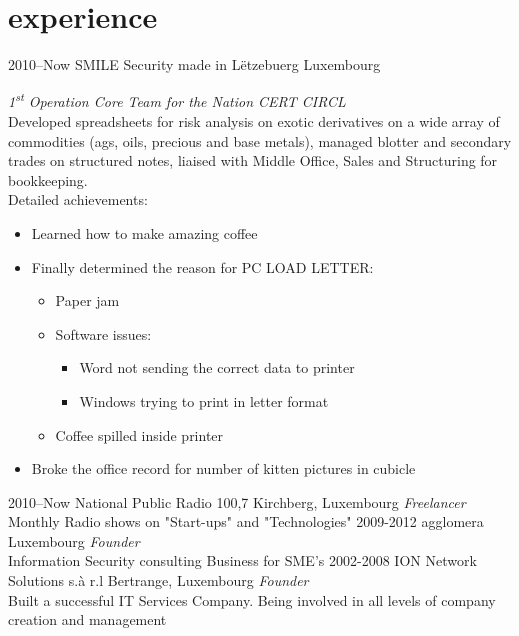 \documentclass[]{friggeri-cv} %
\begin{document}

\section{experience}

\begin{entrylist}
\entry
{2010--Now}
{SMILE Security made in L\"{e}tzebuerg}
{Luxembourg}
{\emph{1\textsuperscript{st} Operation Core Team for the Nation CERT CIRCL} \\

Developed spreadsheets for risk analysis on exotic derivatives on a wide array of commodities (ags, oils, precious and base metals), managed blotter and secondary trades on structured notes, liaised with Middle Office, Sales and Structuring for bookkeeping. \\
Detailed achievements:

\begin{itemize}
\item Learned how to make amazing coffee
\item Finally determined the reason for \textsc{PC LOAD LETTER}:
\begin{itemize}
\item Paper jam
\item Software issues:
\begin{itemize}
\item Word not sending the correct data to printer
\item Windows trying to print in letter format
\end{itemize}
\item Coffee spilled inside printer
\end{itemize}
\item Broke the office record for number of kitten pictures in cubicle
\end{itemize}}

\entry
{2010--Now}
{National Public Radio 100,7}
{Kirchberg, Luxembourg}
{\emph{Freelancer} \\
Monthly Radio shows on "Start-ups" and "Technologies"}
\entry
{2009-2012}
{agglomera}
{Luxembourg}
{\emph{Founder} \\
Information Security consulting Business for SME's}
\entry
{2002-2008}
{ION Network Solutions s.\`{a} r.l}
{Bertrange, Luxembourg}
{\emph{Founder} \\
Built a successful IT Services Company. Being involved in all levels of company creation and management}
\end{entrylist}
\end{document}

